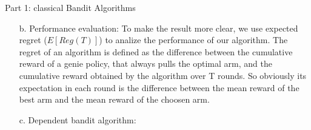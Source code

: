 \documentclass{article}
\begin{document}
\begin{homeworkProblem}{Part 1: classical Bandit Algorithms}
\begin{enumerate}
\begin{enumerate}
            We downloaded a dataset of viewer ratings on movies. The choice of movie we push for the viewer is the arm we choose, and the viewer's final rating is the reward.
            To match a three arm bandit machine, we first implemented the dependent algorightm on choosing three movies to promote. Afterwards we also tried the broader version of 18 movies.
            \item[b.] Performance evaluation:
            To make the result more clear, we use expected regret ($E[Reg(T)]$) to analize the performance of our algorithm.
            The regret of an algorithm is defined as the difference between the cumulative reward of a genie policy, that always pulls the optimal arm, and the cumulative reward obtained by the algorithm over T rounds.
            So obviously its expectation in each round is the difference between the mean reward of the best arm and the mean reward of the choosen arm.
            \item[c.] Dependent bandit algorithm:
            

\end{enumerate}
\end{enumerate}
\end{homeworkProblem}
\end{document}

